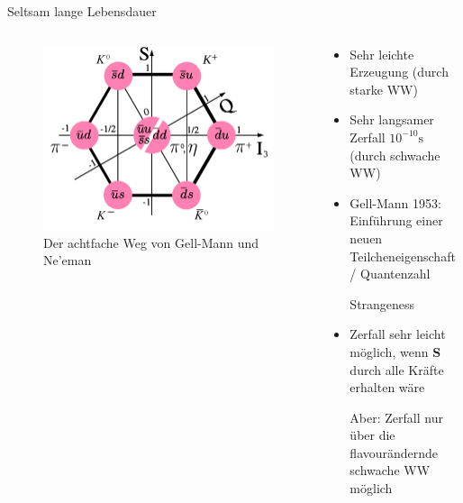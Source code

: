 \documentclass[aspectratio=1610, professionalfonts, 9pt, t]{beamer}
\begin{document}
  \begin{frame}{Seltsam lange Lebensdauer}
    \begin{columns}[onlytextwidth]
      \begin{column}{0.4\textwidth}
        \begin{figure}[ht]
          \begin{center}
            \includegraphics[height=0.6\textheight]{Images/Meson-octet.png} %
            \caption{Der achtfache Weg von Gell-Mann und Ne'eman\cite{oktett}}
          \end{center}
        \end{figure}
      \end{column}
      \begin{column}{0.5\textwidth}
        \begin{itemize}
          \item Sehr leichte Erzeugung (durch starke WW)
          \item Sehr langsamer Zerfall $10^{-10}\si{\second}$ (durch schwache WW)
          \item Gell-Mann 1953: Einführung einer neuen Teilcheneigenschaft/ Quantenzahl \item[\rightarrow] Strangeness
          \item Zerfall sehr leicht möglich, wenn \textbf{S} durch alle Kräfte erhalten wäre
          \item[Aber:] Zerfall nur über die flavourändernde schwache WW möglich
        \end{itemize}
      \end{column}
    \end{columns}
  \end{frame}
\end{document}
